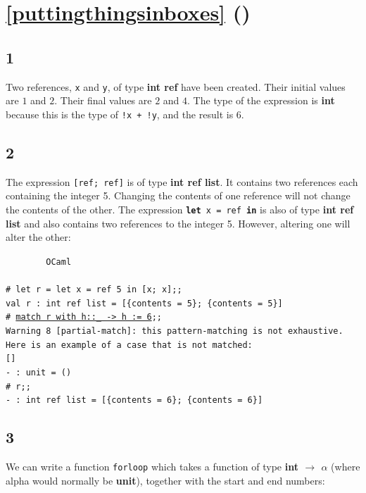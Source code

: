\documentclass[]{book}
\newcommand{\smspace}{\vspace{4mm}}
\begin{document}
\section*{\ref{puttingthingsinboxes} ()}
\subsection*{1}
Two references, \texttt{x} and \texttt{y}, of type \textbf{\textrm{int ref}} have been created. Their initial values are $1$ and $2$. Their final values are $2$ and $4$. The type of the expression is \textrm{\textbf{int}} because this is the type of \texttt{!x\! +\! !y}, and the result is $6$.

\subsection*{2}
The expression \texttt{[ref;\! ref]} is of type \textbf{\textrm{int ref list}}. It contains two references each containing the integer 5. Changing the contents of one reference will not change the contents of the other. The expression \texttt{\textbf{let}\! x\! =\! ref\! \textbf{in}\! [x;\! x]} is also of type \textbf{\textrm{int ref list}} and also contains two references to the integer 5. However, altering one will alter the other:

\smspace
\noindent\verb!        OCaml!\\
\noindent\\
\noindent\verb!# let r = let x = ref 5 in [x; x];;!\\
\noindent\verb!val r : int ref list = [{contents = 5}; {contents = 5}]!\\
\noindent\texttt{\# \underline{\vphantom{g}match r with h::\_ -> h := 6};;}\\
\noindent\verb!Warning 8 [partial-match]: this pattern-matching is not exhaustive.!\\
\noindent\verb!Here is an example of a case that is not matched:!\\
\noindent\verb![]!\\
\noindent\verb!- : unit = ()!\\
\noindent\verb!# r;;!\\
\noindent\verb!- : int ref list = [{contents = 6}; {contents = 6}]!\vphantom{g}

\subsection*{3}
We can write a function \texttt{forloop} which takes a function of type \textrm{\textbf{int $\rightarrow$ $\alpha$}} (where alpha would normally be \textbf{\textrm{unit}}), together with the start and end numbers:
\end{document}
